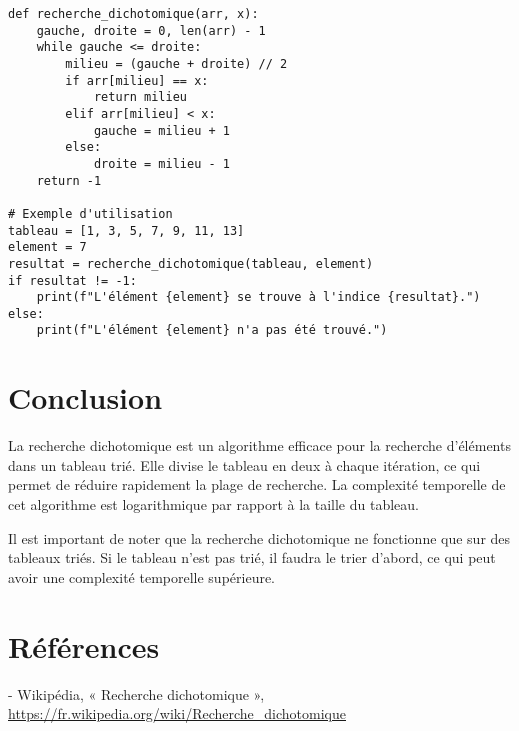 \documentclass{article}
\begin{document}
\begin{verbatim}
def recherche_dichotomique(arr, x):
    gauche, droite = 0, len(arr) - 1
    while gauche <= droite:
        milieu = (gauche + droite) // 2
        if arr[milieu] == x:
            return milieu
        elif arr[milieu] < x:
            gauche = milieu + 1
        else:
            droite = milieu - 1
    return -1

# Exemple d'utilisation
tableau = [1, 3, 5, 7, 9, 11, 13]
element = 7
resultat = recherche_dichotomique(tableau, element)
if resultat != -1:
    print(f"L'élément {element} se trouve à l'indice {resultat}.")
else:
    print(f"L'élément {element} n'a pas été trouvé.")
\end{verbatim}

\section{Conclusion}
La recherche dichotomique est un algorithme efficace pour la recherche d'éléments dans un tableau trié. Elle divise le tableau en deux à chaque itération, ce qui permet de réduire rapidement la plage de recherche. La complexité temporelle de cet algorithme est logarithmique par rapport à la taille du tableau.

Il est important de noter que la recherche dichotomique ne fonctionne que sur des tableaux triés. Si le tableau n'est pas trié, il faudra le trier d'abord, ce qui peut avoir une complexité temporelle supérieure.

\section{Références}
- Wikipédia, « Recherche dichotomique », \url{https://fr.wikipedia.org/wiki/Recherche_dichotomique}
\end{document}
